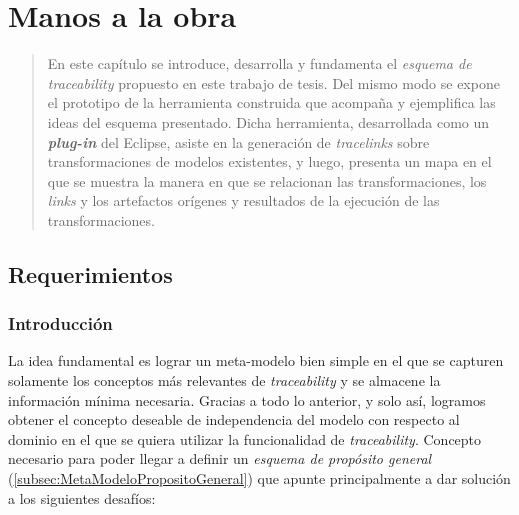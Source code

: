 \documentclass[a4paper,12pt,oneside,spanish]{book}
\begin{document}
\chapter{Manos a la obra}
\label{cap:Propuesta}

\begin{quotation}
En este capítulo se introduce, desarrolla y fundamenta el \textit{esquema de
traceability} propuesto en este trabajo de tesis. Del mismo modo se expone el prototipo de la herramienta construida que acompaña y ejemplifica las ideas del esquema presentado. Dicha herramienta, desarrollada como un \textit{\textbf{plug-in}} del  \textsf{Eclipse}, asiste en la generación de \textit{tracelinks} sobre transformaciones de modelos existentes, y luego, presenta un mapa en el que se muestra la manera en que se relacionan las transformaciones, los \textit{links} y los artefactos orígenes y resultados de la ejecución de las transformaciones.
\end{quotation}


\bigskip


\minitoc 


\pagebreak


\section{Requerimientos}


\subsection{Introducción}
\label{sec:EsquemaPropIntro}

La idea fundamental es lograr un meta-modelo bien simple en el que se capturen solamente los conceptos más relevantes de \textit{traceability} y se almacene la información mínima necesaria. Gracias a todo lo anterior, y solo así, logramos obtener el concepto deseable de independencia del modelo con respecto al dominio en el que se quiera utilizar la funcionalidad de \textit{traceability}. Concepto necesario para poder llegar a definir un \textit{esquema de propósito general} (\ref{subsec:MetaModeloPropositoGeneral}) que apunte principalmente a dar solución a los siguientes desafíos:
\end{document}
